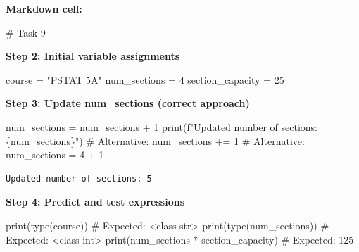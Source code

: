 \documentclass[
  11pt,
]{article}
\newenvironment{Shaded}{\begin{snugshade}}{\end{snugshade}}
\newcommand{\BuiltInTok}[1]{\textcolor[rgb]{0.00,0.23,0.31}{#1}}
\newcommand{\CommentTok}[1]{\textcolor[rgb]{0.37,0.37,0.37}{#1}}
\newcommand{\DecValTok}[1]{\textcolor[rgb]{0.68,0.00,0.00}{#1}}
\newcommand{\NormalTok}[1]{\textcolor[rgb]{0.00,0.23,0.31}{#1}}
\newcommand{\OperatorTok}[1]{\textcolor[rgb]{0.37,0.37,0.37}{#1}}
\newcommand{\SpecialCharTok}[1]{\textcolor[rgb]{0.37,0.37,0.37}{#1}}
\newcommand{\SpecialStringTok}[1]{\textcolor[rgb]{0.13,0.47,0.30}{#1}}
\newcommand{\StringTok}[1]{\textcolor[rgb]{0.13,0.47,0.30}{#1}}
\begin{document}
\textbf{Markdown cell:}

\begin{Shaded}
\begin{Highlighting}[]
\NormalTok{\# Task 9}
\end{Highlighting}
\end{Shaded}

\textbf{Step 2: Initial variable assignments}

\begin{Shaded}
\begin{Highlighting}[]
\NormalTok{course }\OperatorTok{=} \StringTok{"PSTAT 5A"}
\NormalTok{num\_sections }\OperatorTok{=} \DecValTok{4}
\NormalTok{section\_capacity }\OperatorTok{=} \DecValTok{25}
\end{Highlighting}
\end{Shaded}

\textbf{Step 3: Update num\_sections (correct approach)}

\begin{Shaded}
\begin{Highlighting}[]
\NormalTok{num\_sections }\OperatorTok{=}\NormalTok{ num\_sections }\OperatorTok{+} \DecValTok{1}
\BuiltInTok{print}\NormalTok{(}\SpecialStringTok{f"Updated number of sections: }\SpecialCharTok{\{}\NormalTok{num\_sections}\SpecialCharTok{\}}\SpecialStringTok{"}\NormalTok{)}
\CommentTok{\# Alternative: num\_sections += 1}
\CommentTok{\# Alternative: num\_sections = 4 + 1}
\end{Highlighting}
\end{Shaded}

\begin{verbatim}
Updated number of sections: 5
\end{verbatim}

\textbf{Step 4: Predict and test expressions}

\begin{Shaded}
\begin{Highlighting}[]
\BuiltInTok{print}\NormalTok{(}\BuiltInTok{type}\NormalTok{(course))           }\CommentTok{\# Expected: \textless{}class \textquotesingle{}str\textquotesingle{}\textgreater{}}
\BuiltInTok{print}\NormalTok{(}\BuiltInTok{type}\NormalTok{(num\_sections))     }\CommentTok{\# Expected: \textless{}class \textquotesingle{}int\textquotesingle{}\textgreater{}}
\BuiltInTok{print}\NormalTok{(num\_sections }\OperatorTok{*}\NormalTok{ section\_capacity) }\CommentTok{\# Expected: 125}
\end{Highlighting}
\end{Shaded}
\end{document}
